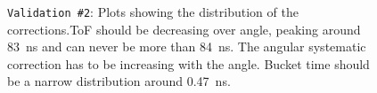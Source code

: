 \documentclass[12pt]{article}
\begin{document}
\begin{figure}
\centering
\noindent{}
  \caption{\centering \texttt{Validation \#2}: Plots showing the distribution of the corrections.\hspace{\textwidth}ToF should be decreasing over angle, peaking around 83~ns and can never be more than 84~ns. The angular systematic correction has to be increasing with the angle. Bucket time should be a narrow distribution around 0.47~ns. }
  \label{fig:val25}
\end{figure}
\end{document}
